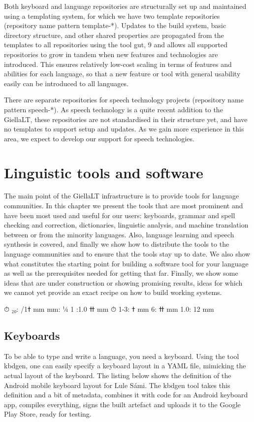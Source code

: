 \documentclass[free]{flammie}
\begin{document}
Both keyboard and language repositories are structurally set up and maintained using a
templating system, for which we have two template repositories (repository name pattern
template-*). Updates to the build system, basic directory structure, and other shared
properties are propagated from the templates to all repositories using the tool gut,
9
and
allows all supported repositories to grow in tandem when new features and technologies
are introduced. This ensures relatively low-cost scaling in terms of features and abilities
for each language, so that a new feature or tool with general usability easily can be introduced to all languages.

There are separate repositories for speech technology projects (repository name pattern
speech-*). As speech technology is a quite recent addition to the GiellaLT, these repositories are not standardised in their structure yet, and have no templates to support setup
and updates. As we gain more experience in this area, we expect to develop our support for
speech technologies.

\section{Linguistic tools and software}

The main point of the GiellaLT infrastructure is to provide tools for language communities.
In this chapter we present the tools that are most prominent and have been most used and
useful for our users: keyboards, grammar and spell checking and correction, dictionaries,
linguistic analysis, and machine translation between or from the minority languages. Also,
language learning and speech synthesis is covered, and finally we show how to distribute
the tools to the language communities and to ensure that the tools stay up to date.
We also show what constitutes the starting point for building a software tool for your
language as well as the prerequisites needed for getting that far. Finally, we show some
ideas that are under construction or showing promising results, ideas for which we cannot
yet provide an exact recipe on how to build working systems.

⏱
ߙ1/ :₂₀ mm
mm: ¼ ߚ
1.0: 1 mm
⏱
ߙ :1-3 mm
ߚ :6 mm
1.0: 12 mm

\subsection{Keyboards}

To be able to type and write a language, you need a keyboard. Using the tool kbdgen, one
can easily specify a keyboard layout in a YAML file, mimicking the actual layout of the
keyboard. The listing below shows the definition of the Android mobile keyboard layout
for Lule Sámi. The kbdgen tool takes this definition and a bit of metadata, combines it
with code for an Android keyboard app, compiles everything, signs the built artefact and
uploads it to the Google Play Store, ready for testing.
\end{document}
